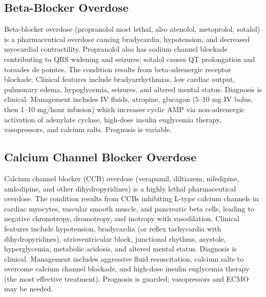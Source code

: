 \subsection{Beta-Blocker Overdose}
\label{sec:Beta-Blocker Overdose}
Beta-blocker overdose (propranolol most lethal, also atenolol, metoprolol, sotalol) is a pharmaceutical overdose causing bradycardia, hypotension, and decreased myocardial contractility. Propranolol also has sodium channel blockade contributing to QRS widening and seizures; sotalol causes QT prolongation and torsades de pointes. The condition results from beta-adrenergic receptor blockade. Clinical features include bradyarrhythmias, low cardiac output, pulmonary edema, hypoglycemia, seizures, and altered mental status. Diagnosis is clinical. Management includes IV fluids, atropine, glucagon (5--10 mg IV bolus, then 1--10 mg/hour infusion) which increases cyclic AMP via non-adrenergic activation of adenylate cyclase, high-dose insulin euglycemia therapy, vasopressors, and calcium salts. Prognosis is variable.

\subsection{Calcium Channel Blocker Overdose}
\label{sec:CCB Overdose}
Calcium channel blocker (CCB) overdose (verapamil, diltiazem, nifedipine, amlodipine, and other dihydropyridines) is a highly lethal pharmaceutical overdose. The condition results from CCBs inhibiting L-type calcium channels in cardiac myocytes, vascular smooth muscle, and pancreatic beta cells, leading to negative chronotropy, dromotropy, and inotropy with vasodilation. Clinical features include hypotension, bradycardia (or reflex tachycardia with dihydropyridines), atrioventricular block, junctional rhythms, asystole, hyperglycemia, metabolic acidosis, and altered mental status. Diagnosis is clinical. Management includes aggressive fluid resuscitation, calcium salts to overcome calcium channel blockade, and high-dose insulin euglycemia therapy (the most effective treatment). Prognosis is guarded; vasopressors and ECMO may be needed.

